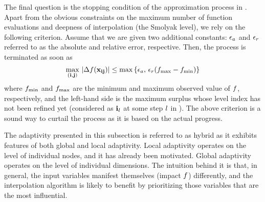 The final question is the stopping condition of the approximation process in
. Apart from the obvious constraints on the maximum number
of function evaluations and deepness of interpolation (the Smolyak level), we
rely on the following criterion. Assume that we are given two additional
constants: $\epsilon_a$ and $\epsilon_r$ referred to as the absolute and relative
error, respective. Then, the process is terminated as soon as
\begin{equation} \elab{stopping-condition}
  \max_{(\vi, \vj)} \, |\surplus(\vx_{\vi\vj})| \leq \max \left\{ \aerror, \, \rerror (\f_\text{max} - \f_\text{min}) \right\}
\end{equation}
where $f_\text{min}$ and $f_\text{max}$ are the minimum and maximum observed
value of $f$, respectively, and the left-hand side is the maximum surplus whose
level index has not been refined yet (considered as $\mathbf{i}_l$ at some step $l$
in ). The above criterion is a sound way to curtail the
process as it is based on the actual progress.

The adaptivity presented in this subsection is referred to as hybrid as it
exhibits features of both global and local adaptivity. Local adaptivity operates
on the level of individual nodes, and it has already been motivated. Global
adaptivity operates on the level of individual dimensions. The intuition behind
it is that, in general, the input variables manifest themselves (impact $f$)
differently, and the interpolation algorithm is likely to benefit by
prioritizing those variables that are the most influential.
